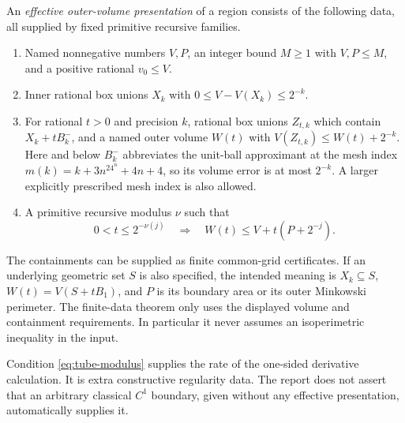 An \emph{effective outer-volume presentation} of a region consists of
the following data, all supplied by fixed primitive recursive families.
\begin{enumerate}
\item Named nonnegative numbers \(V,P\), an integer bound \(M\geq1\)
with \(V,P\leq M\), and a positive rational \(v_0\leq V\).
\item Inner rational box unions \(X_k\) with
\(0\leq V-V(X_k)\leq2^{-k}\).
\item For rational \(t>0\) and precision \(k\), rational box unions
\(Z_{t,k}\) which contain
\(X_k+tB_k^-\), and a named outer volume \(W(t)\) with
\(V(Z_{t,k})\leq W(t)+2^{-k}\).
Here and below \(B_k^-\) abbreviates the unit-ball approximant at the
mesh index \(m(k)=k+3n^24^n+4n+4\), so its volume error is at most
\(2^{-k}\). A larger explicitly prescribed mesh index is also allowed.
\item A primitive recursive modulus \(\nu\) such that
\begin{equation}\label{eq:tube-modulus}
 0<t\leq2^{-\nu(j)}\quad\Longrightarrow\quad
 W(t)\leq V+t(P+2^{-j}).
\end{equation}
\end{enumerate}
The containments can be supplied as finite common-grid certificates.
If an underlying geometric set \(S\) is also specified, the intended
meaning is \(X_k\subseteq S\),
\(W(t)=V(S+tB_1)\), and \(P\) is its boundary area or its outer
Minkowski perimeter. The finite-data theorem only uses the displayed
volume and containment requirements. In particular it never assumes an
isoperimetric inequality in the input.

Condition \eqref{eq:tube-modulus} supplies the rate of the one-sided
derivative calculation. It is extra constructive regularity data. The
report does not assert that an arbitrary classical \(C^1\) boundary,
given without any effective presentation, automatically supplies it.

